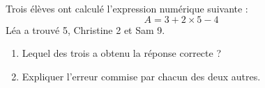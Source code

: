 \documentclass[exercice]{thedocument}%
\begin{document}
%
Trois élèves ont calculé l'expression numérique suivante :
$$A=3+2\times5-4$$
Léa a trouvé 5, Christine 2 et Sam 9.\vskip5pt
\begin{enumerate}
    \item Lequel des trois a obtenu la réponse correcte ?
    \item Expliquer l'erreur commise par chacun des deux autres.
\end{enumerate}
\end{document}
